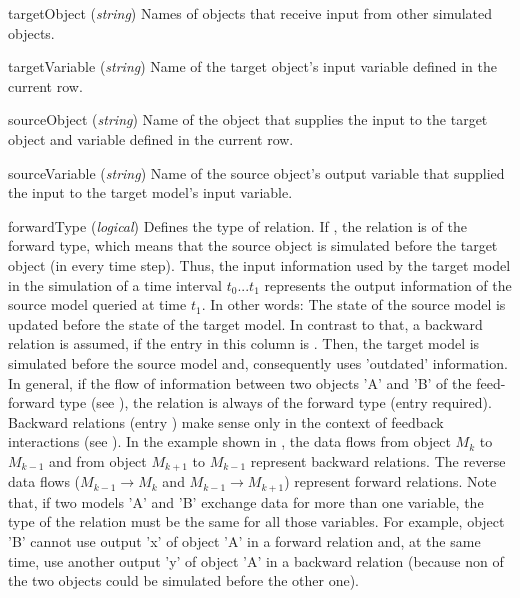 \begin{columndef}
  \item [targetObject] (\textit{string}) Names of objects that receive input from other simulated objects.
  \item [targetVariable] (\textit{string}) Name of the target object's input variable defined in the current row.
  \item [sourceObject] (\textit{string}) Name of the object that supplies the input to the target object and variable defined in the current row.
  \item [sourceVariable] (\textit{string}) Name of the source object's output variable that supplied the input to the target model's input variable.
  \item [forwardType] (\textit{logical}) Defines the type of relation. If \true{}, the relation is of the forward type, which means that the source object is simulated before the target object (in every time step). Thus, the input information used by the target model in the simulation of a time interval $t_0$...$t_1$ represents the output information of the source model queried at time $t_1$. In other words: The state of the source model is updated before the state of the target model. In contrast to that, a backward relation is assumed, if the entry in this column is \false{}. Then, the target model is simulated before the source model and, consequently uses 'outdated' information. In general, if the flow of information between two objects 'A' and 'B' of the feed-forward type (see ), the relation is always of the forward type (entry \true{} required). Backward relations (entry \false{}) make sense only in the context of feedback interactions (see ). In the example shown in , the data flows from object $M_k$ to $M_{k-1}$ and from object $M_{k+1}$ to $M_{k-1}$ represent backward relations. The reverse data flows ($M_{k-1} \rightarrow M_k$ and $M_{k-1} \rightarrow M_{k+1}$) represent forward relations. Note that, if two models 'A' and 'B' exchange data for more than one variable, the type of the relation must be the same for all those variables. For example, object 'B' cannot use output 'x' of object 'A' in a forward relation and, at the same time, use another output 'y' of object 'A' in a backward relation (because non of the two objects could be simulated before the other one).
\end{columndef}

